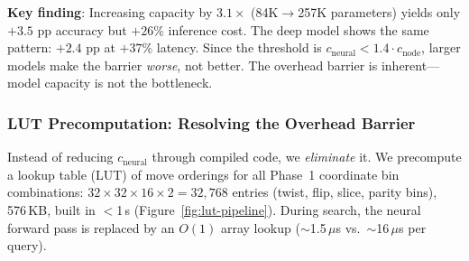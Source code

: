 \documentclass[conference]{IEEEtran}
\begin{document}
\textbf{Key finding}: Increasing capacity by $3.1{\times}$ (84K$\to$257K parameters) yields only $+3.5$ pp accuracy but $+26$\% inference cost. The deep model shows the same pattern: $+2.4$ pp at $+37$\% latency. Since the threshold is $c_{\text{neural}} < 1.4 \cdot c_{\text{node}}$, larger models make the barrier \emph{worse}, not better. The overhead barrier is inherent---model capacity is not the bottleneck.

\subsubsection{LUT Precomputation: Resolving the Overhead Barrier}
\label{sec:lut}

Instead of reducing $c_{\text{neural}}$ through compiled code, we \emph{eliminate} it. We precompute a lookup table (LUT) of move orderings for all Phase~1 coordinate bin combinations: $32 \times 32 \times 16 \times 2 = 32{,}768$ entries (twist, flip, slice, parity bins), 576\,KB, built in $<$1\,s (Figure~\ref{fig:lut-pipeline}). During search, the neural forward pass is replaced by an $O(1)$ array lookup ($\sim$1.5\,$\mu$s vs.\ $\sim$16\,$\mu$s per query).
\end{document}
